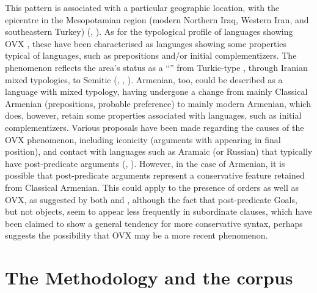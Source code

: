 \documentclass[output=paper,colorlinks,citecolor=brown,draftmode]{langscibook}
\begin{document}
This pattern is associated with a particular geographic location, with the epicentre in the Mesopotamian region (modern Northern Iraq, Western Iran, and southeastern Turkey) (\citealt{haig_introduction_2018}, ). As for the typological profile of languages showing OVX , these have been characterised as  languages showing some properties typical of  languages, such as prepositions and/or initial complementizers. The phenomenon reflects the area's status as a ``'' from Turkic-type , through Iranian mixed typologies, to Semitic  (\citealt{stilo2006circumpositions}, \citealt{haig_introduction_2018}, ). Armenian, too, could be described as a language with mixed typology, having undergone a change from mainly  Classical Armenian (prepositions, probable  preference) to mainly  modern Armenian, which does, however, retain some properties associated with  languages, such as initial complementizers. Various proposals have been made regarding the causes of the OVX phenomenon, including iconicity (arguments with  appearing in final position), and contact with languages such as Aramaic (or Russian) that typically have post-predicate arguments (\citealt{haig_introduction_2018}, ). However, in the case of Armenian, it is possible that post-predicate arguments represent a conservative feature retained from Classical Armenian. This could apply to the presence of  orders as well as OVX, as suggested by both \citet{samvelian_persistence_2023} and \citet{stilo_preverbal_2018}, although the fact that post-predicate Goals, but not objects, seem to appear less frequently in subordinate clauses, which have been claimed to show a general tendency for more conservative syntax, perhaps suggests the possibility that OVX may be a more recent phenomenon.

\section{The Methodology and the corpus}\label{Armenian:ss:2}
\end{document}
